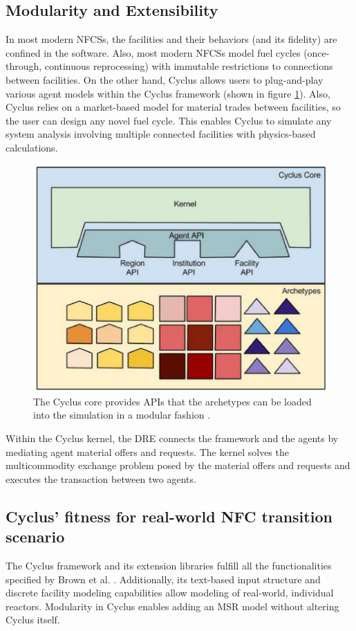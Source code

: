 \subsection{Modularity and Extensibility}
In most modern \glspl{NFCS}, the facilities and their
behaviors (and its fidelity) are confined in the software.
Also, most modern \glspl{NFCS} model
fuel cycles (once-through, continuous reprocessing)
with immutable restrictions to connections between facilities. On the
other hand, Cyclus allows users to plug-and-play various agent models
within the Cyclus framework (shown in figure \ref{fig:core}).
Also, Cyclus relies on a market-based model
for material trades between facilities, so the user can design
any novel fuel cycle. This enables Cyclus to simulate any system analysis
involving multiple connected facilities with physics-based
calculations.


\begin{figure}[htbp!]
	\begin{center}
		\includegraphics[scale=0.3]{./images/cyclus_core.png}
	\end{center}
	\caption{The Cyclus core provides APIs that the archetypes
			can be loaded into the simulation in a modular fashion
			\cite{huff_fundamental_2016}.}
	\label{fig:core}
\end{figure}

Within the Cyclus kernel, the \gls{DRE} connects
the framework and the agents by mediating agent material
offers and requests.
The kernel solves the multicommodity exchange problem
posed by the material offers and requests and executes
the transaction between two agents.

\subsection{Cyclus' fitness for real-world \gls{NFC} transition scenario}
The Cyclus framework and its extension libraries fulfill all the functionalities
specified by Brown et al. \cite{brown_identification_2016}.  Additionally,
its text-based input structure and discrete facility modeling capabilities
allow modeling of real-world, individual reactors. 
Modularity in Cyclus enables adding an \gls{MSR} model without altering Cyclus
itself.
